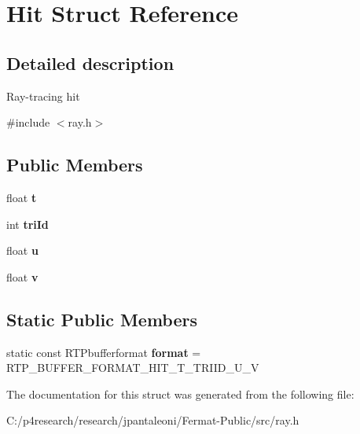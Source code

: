 \hypertarget{struct_hit}{}\section{Hit Struct Reference}
\label{struct_hit}


\subsection{Detailed description}
Ray-\/tracing hit 

{\ttfamily \#include $<$ray.\+h$>$}

\subsection*{Public Members}
\begin{DoxyCompactItemize}
\item 
\mbox{\label{struct_hit_a1ae6a3d9a5c8b1225a827d247947bc25}} 
float {\bfseries t}
\item 
\mbox{\label{struct_hit_af329573ccab082ecba3dfac8142d22df}} 
int {\bfseries tri\+Id}
\item 
\mbox{\label{struct_hit_a393189286fc8bf21e8dd69e610a6ab16}} 
float {\bfseries u}
\item 
\mbox{\label{struct_hit_a13c64f486914f22a4a14cfdbdc008dc3}} 
float {\bfseries v}
\end{DoxyCompactItemize}
\subsection*{Static Public Members}
\begin{DoxyCompactItemize}
\item 
\mbox{\label{struct_hit_ad194a1c0922885432181db0ff697bf96}} 
static const R\+T\+Pbufferformat {\bfseries format} = R\+T\+P\+\_\+\+B\+U\+F\+F\+E\+R\+\_\+\+F\+O\+R\+M\+A\+T\+\_\+\+H\+I\+T\+\_\+\+T\+\_\+\+T\+R\+I\+I\+D\+\_\+\+U\+\_\+V
\end{DoxyCompactItemize}


The documentation for this struct was generated from the following file\+:\begin{DoxyCompactItemize}
\item 
C\+:/p4research/research/jpantaleoni/\+Fermat-\/\+Public/src/ray.\+h\end{DoxyCompactItemize}
